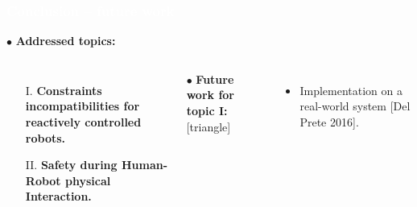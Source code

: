 




\begin{frame}
\frametitle{{\textcolor{white}{\hspace{0.3cm}Conclusion -- future work}}}
\hspace{-6mm}
$\bullet$ {\color{blue-violet}\textbf{Addressed topics:}}
\begin{columns}
\column{\paperwidth-10mm}
\begin{itemize}
\item[I.]  {\color{red}\textbf{Constraints incompatibilities for reactively controlled robots.}}
\item[II.] {\color{red}\textbf{Safety during Human-Robot physical Interaction.}}
\end{itemize}
\vspace{5mm}
$\bullet$ {\color{ao(english)}\textbf{Future work for topic I:}}
[triangle] 
\begin{itemize}
\item Implementation on a real-world system [Del Prete 2016].
\end{itemize}

\end{columns}
\end{frame}







